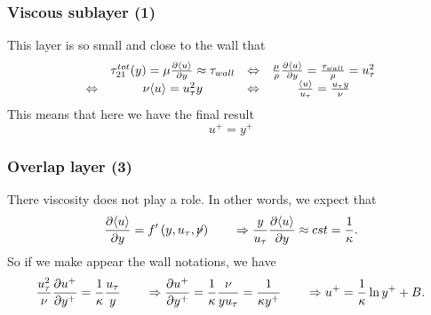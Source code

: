 		\subsubsection{Viscous sublayer (1)}
			This layer is so small and close to the wall that 	
			\begin{equation}
			\begin{array}{cccc}
				&\tau _{21} ^{tot}(y)= \mu \frac{\D \langle u \rangle }{\D y} \approx \tau _{wall}  &\Leftrightarrow  &\frac{\mu}{\rho}\frac{\D \langle u \rangle }{\D y} = \frac{\tau _{wall}}{\rho} = u_\tau ^2\\
				\Leftrightarrow &\nu \langle u \rangle = u^2_{\tau} y &\Leftrightarrow  &\frac{\langle u \rangle }{u_\tau} = \frac{u_\tau y}{\nu}
			\end{array}
			\end{equation}
			This means that here we have the final result 
			\begin{equation}
				u^+ = y^+
			\end{equation}
			
		\subsubsection{Overlap layer (3)}
			There viscosity does not play a role. In other words, we expect that 
			\begin{equation}
				\frac{\D \langle u \rangle}{\D y} = f'\left(y, u_\tau , \cancel{\nu}\right) \qquad \Rightarrow \frac{y}{u_\tau}\frac{\D \langle u \rangle}{\D y} \approx cst = \frac{1}{\kappa}.
			\end{equation}
			So if we make appear the wall notations, we have
			\begin{equation}
				\frac{u_\tau^2}{\nu}\frac{\D u^+ }{\D y^+} = \frac{1}{\kappa}  \frac{u_\tau}{y} \qquad\Rightarrow \frac{\D  u^+}{\D y^+} = \frac{1}{\kappa}\frac{\nu}{yu_\tau} = \frac{1}{\kappa y^+} \qquad \Rightarrow u^+ = \frac{1}{\kappa}\ln y^+ + B.
			\end{equation}
						
